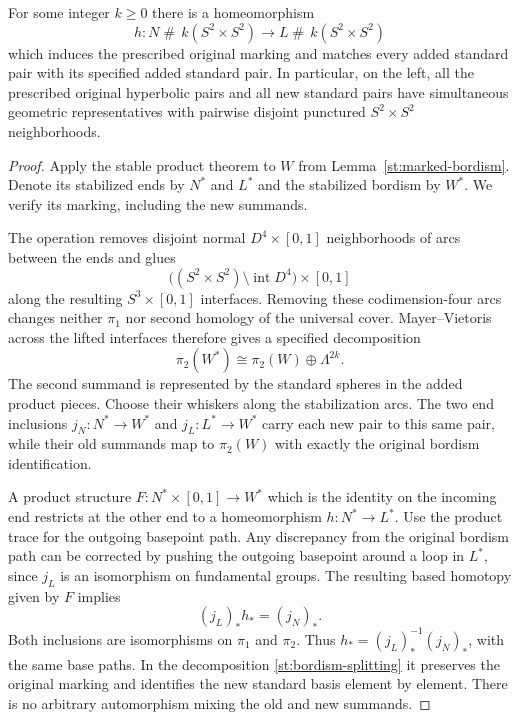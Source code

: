 \begin{proposition}\label{st:stable-product}
For some integer $k\ge0$ there is a homeomorphism
\[
 h\colon N\mathbin{\#}\,k(S^2\times S^2)
 \longrightarrow
 L\mathbin{\#}\,k(S^2\times S^2)
\]
which induces the prescribed original marking and matches every added
standard pair with its specified added standard pair.  In particular,
on the left, all the prescribed original hyperbolic pairs and all new
standard pairs have simultaneous geometric representatives with
pairwise disjoint punctured $S^2\times S^2$ neighborhoods.
\end{proposition}

\begin{proof}
Apply the stable product theorem to $W$ from
Lemma~\ref{st:marked-bordism}.  Denote its stabilized ends by $N^*$ and
$L^*$ and the stabilized bordism by $W^*$.  We verify its marking,
including the new summands.

The operation removes disjoint normal $D^4\times[0,1]$ neighborhoods
of arcs between the ends and glues
\[
 \bigl((S^2\times S^2)\setminus\operatorname{int}D^4\bigr)
 \times[0,1]
\]
along the resulting $S^3\times[0,1]$ interfaces.  Removing these
codimension-four arcs changes neither $\pi_1$ nor second homology of
the universal cover.  Mayer--Vietoris across the lifted interfaces
therefore gives a specified decomposition
\begin{equation}\label{st:bordism-splitting}
 \pi_2(W^*)\cong\pi_2(W)\oplus\Lambda^{2k}.
\end{equation}
The second summand is represented by the standard spheres in the added
product pieces.  Choose their whiskers along the stabilization arcs.
The two end inclusions $j_N\colon N^*\to W^*$ and
$j_L\colon L^*\to W^*$ carry each new pair to this same pair, while
their old summands map to $\pi_2(W)$ with exactly the original bordism
identification.

A product structure $F\colon N^*\times[0,1]\to W^*$ which is the
identity on the incoming end restricts at the other end to a
homeomorphism $h\colon N^*\to L^*$.  Use the product trace for the
outgoing basepoint path.  Any discrepancy from the original bordism
path can be corrected by pushing the outgoing basepoint around a loop
in $L^*$, since $j_L$ is an isomorphism on fundamental groups.
The resulting based homotopy given by $F$ implies
\[
 (j_L)_*h_*=(j_N)_*.
\]
Both inclusions are isomorphisms on $\pi_1$ and $\pi_2$.  Thus
$h_*=(j_L)_*^{-1}(j_N)_*$, with the same base paths.  In the
decomposition \eqref{st:bordism-splitting} it
preserves the original marking and identifies the new standard basis
element by element.  There is no arbitrary automorphism mixing the
old and new summands.


\end{proof}
